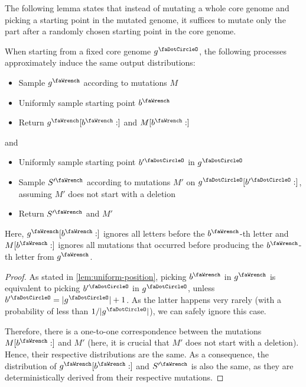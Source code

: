 The following lemma states that instead of mutating a whole core genome and picking a starting point in the mutated genome, it suffices to mutate only the part after a randomly chosen starting point in the core genome.
\begin{lemma}[] \label{lem:ignore-early-mutations}
	When starting from a fixed core genome $\genome^\gcore$, the following processes approximately induce the same output distributions:
	\begin{itemize}
		\item Sample $\genome^\gmut$ according to mutations $M$
		\item Uniformly sample starting point $\startInGenome^\gmut$
		\item Return $\genome^\gmut[\startInGenome^\gmut:]$ and $M[\startInGenome^\gmut:]$
	\end{itemize}
	and
	\begin{itemize}
		\item Uniformly sample starting point $\startInGenome'^\gcore$ in $\genome^\gcore$
		\item Sample $\seq'^\gmut$ according to mutations $M'$ on $\genome^\gcore[\startInGenome'^\gcore:]$, assuming $M'$ does not start with a deletion
		\item Return $\seq'^\gmut$ and $M'$
	\end{itemize}
	Here, $\genome^\gmut[\startInGenome^\gmut:]$ ignores all letters before the $\startInGenome^\gmut$-th letter and $M[\startInGenome^\gmut:]$ ignores all mutations that occurred before producing the $\startInGenome^\gmut$-th letter from $\genome^\gmut$.
\end{lemma}
\begin{proof}
	As stated in \cref{lem:uniform-position}, picking $\startInGenome^\gmut$ in $\genome^\gmut$ is equivalent to picking $\startInGenome'^\gcore$ in $\genome^\gcore$, unless $\startInGenome'^\gcore = |\genome^\gcore|+1$.
	As the latter happens very rarely (with a probability of less than $1/|\genome^\gcore|$), we can safely ignore this case.

	Therefore, there is a one-to-one correspondence between the mutations $M[\startInGenome^\gmut:]$ and $M'$ (here, it is crucial that $M'$ does not start with a deletion). Hence, their respective distributions are the same.
	As a consequence, the distribution of $\genome^\gmut[\startInGenome^\gmut:]$ and $\seq'^\gmut$ is also the same, as they are deterministically derived from their respective mutations.
\end{proof}

